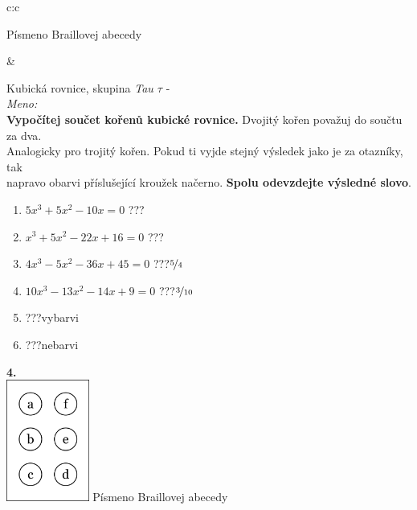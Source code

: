 \documentclass[10pt]{report}
\begin{document}
\begin{tabular}{c:c}
\begin{minipage}[c][99mm][t]{0.49\linewidth}
\begin{center}
\begin{minipage}{0.20\linewidth}
\begin{center}
{\small Písmeno Braillovej abecedy}
\end{center}
\end{minipage}
\end{center}
\end{minipage}
&
\begin{minipage}[c][99mm][t]{0.49\linewidth}
\begin{center}
\vspace{7mm}
{\huge Kubická rovnice, skupina \textit{Tau $\tau$} -}\\[4.5mm]
\textit{Meno:}\phantom{xxxxxxxxxxxxxxxxxxxxxxxxxxxxxxxxxxxxxxxxxxxxxxxxxxxxxxxxxxxxxxxxx}\\[3.5mm]
\textbf{Vypočítej součet kořenů kubické rovnice.} Dvojitý kořen považuj do součtu za dva.\\Analogicky pro trojitý kořen. Pokud ti vyjde stejný výsledek jako je za otazníky, tak\\napravo obarvi příslušející kroužek načerno. \textbf{Spolu odevzdejte výsledné slovo}.\\[3mm]
\begin{minipage}{0.77\linewidth}
\begin{center}
\begin{varwidth}{\textwidth}
\begin{enumerate}
\large
\item $5x^3+5x^2-10x=0$\quad \dotfill\; ???\;\dotfill {}
\item $x^3+5x^2-22x+16=0$\quad \dotfill\; ???\;\dotfill {}
\item $4x^3-5x^2-36x+45=0$\quad \dotfill\; ???\;\dotfill \quad $\nicefrac{5}{4}$
\item $10x^3-13x^2-14x+9=0$\quad \dotfill\; ???\;\dotfill \quad $\nicefrac{3}{10}$
\item \quad \dotfill\; ???\;\dotfill \quad vybarvi
\item \quad \dotfill\; ???\;\dotfill \quad nebarvi
\end{enumerate}
\end{varwidth}
\end{center}
\end{minipage}
\begin{minipage}{0.20\linewidth}
\begin{center}
{\Huge\bfseries 4.} \\[2mm]
\includegraphics[height=40mm]{../images/braille.png}
{\small Písmeno Braillovej abecedy}
\end{center}
\end{minipage}
\end{center}
\end{minipage}

\end{tabular}
\end{document}
